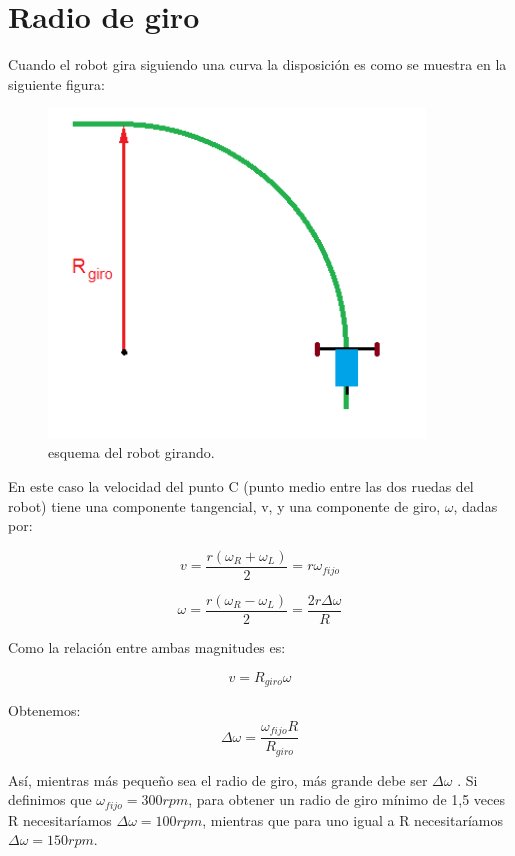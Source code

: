 \documentclass[10pt,conference,a4paper,onecolumn]{article}%
\begin{document}
\section{Radio de giro}
Cuando el robot gira siguiendo una curva la disposición es como se muestra en la siguiente figura:

\begin{figure}[h]
\centering
\includegraphics[width=10cm]{./imagenes/carrito_girando.png}
\caption{esquema del robot girando.}
\label{fig:girando}
\end{figure}

En este caso la velocidad del punto  C (punto medio entre las dos ruedas del robot) tiene una componente tangencial, v, y una componente de giro, $\omega$, dadas por:

\begin{equation}
v =\frac{r(\omega _R + \omega _L) }{2}=r \omega _{fijo}
\end{equation}

\begin{equation}
\omega =\frac{r(\omega _R - \omega _L) }{2}= \frac{ 2 r \Delta \omega} {R}
\end{equation}

Como la relación entre ambas magnitudes es:


\begin{equation}
v=R_{giro} \omega
\end{equation}

Obtenemos:
\begin{equation}
\Delta \omega= \frac{\omega _{fijo} R}{R_{giro}}  
\end{equation}

Así, mientras más pequeño sea el radio de giro, más grande debe ser $\Delta \omega$ . Si definimos que $\omega _{fijo}=300 rpm $, para obtener un radio de giro mínimo de 1,5 veces R necesitaríamos $\Delta \omega =100 rpm $, mientras que para uno igual a R necesitaríamos $\Delta \omega =150 rpm $.
\end{document}
